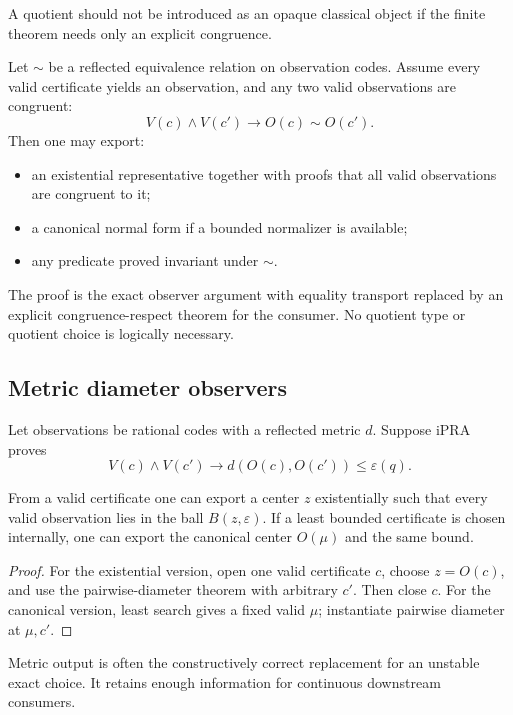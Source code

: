 A quotient should not be introduced as an opaque classical object if the finite theorem needs only an explicit congruence.

Let \(\sim\) be a reflected equivalence relation on observation codes.  Assume every valid certificate yields an observation, and any two valid observations are congruent:
\[
  V(c)\wedge V(c')\to O(c)\sim O(c').
\]
Then one may export:

\begin{itemize}
\item an existential representative together with proofs that all valid observations are congruent to it;
\item a canonical normal form if a bounded normalizer is available;
\item any predicate proved invariant under \(\sim\).
\end{itemize}

The proof is the exact observer argument with equality transport replaced by an explicit congruence-respect theorem for the consumer.  No quotient type or quotient choice is logically necessary.

\subsection{Metric diameter observers}

Let observations be rational codes with a reflected metric \(d\).  Suppose iPRA proves
\[
  V(c)\wedge V(c')\to d(O(c),O(c'))\le\varepsilon(q).
\]

\begin{theorem}
From a valid certificate one can export a center \(z\) existentially such that every valid observation lies in the ball \(B(z,\varepsilon)\).  If a least bounded certificate is chosen internally, one can export the canonical center \(O(\mu)\) and the same bound.
\end{theorem}
\begin{proof}
For the existential version, open one valid certificate \(c\), choose \(z=O(c)\), and use the pairwise-diameter theorem with arbitrary \(c'\).  Then close \(c\).  For the canonical version, least search gives a fixed valid \(\mu\); instantiate pairwise diameter at \(\mu,c'\).
\end{proof}

Metric output is often the constructively correct replacement for an unstable exact choice.  It retains enough information for continuous downstream consumers.

